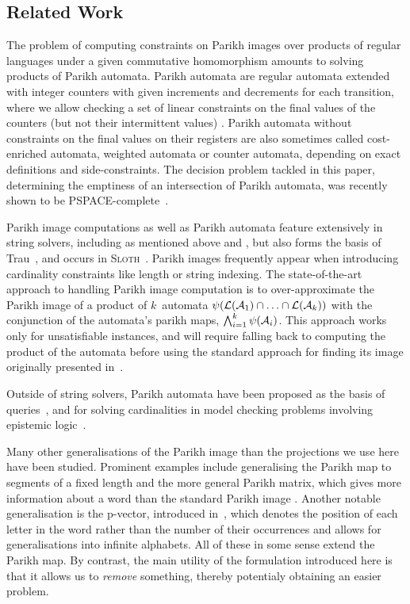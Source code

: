 \documentclass[acmsmall,review,anonymous,screen]{acmart}\settopmatter{printfolios=true,printccs=true,printacmref=true}
\theoremstyle{definition}
\begin{document}
\subsection{Related Work}

The problem of computing constraints on Parikh images over products of regular
languages under a given commutative homomorphism amounts to solving products of
Parikh automata. Parikh automata are regular automata extended with integer
counters with given increments and decrements for each transition, where we
allow checking a set of linear constraints on the final values of the counters
(but not their intermittent values) \cite{parikh-automata}. Parikh automata
without constraints on the final values on their registers are also sometimes
called cost-enriched automata, weighted automata or counter automata, depending
on exact definitions and side-constraints. The decision problem tackled in this
paper, determining the emptiness of an intersection of Parikh automata, was
recently shown to be PSPACE-complete~\cite{graph-queries}.

Parikh image computations as well as Parikh automata feature extensively in
string solvers, including as mentioned above \Ostrich{} and \OstrichPlus{}
\cite{ostrich,ostrich-plus}, but also forms the basis of Trau~\cite{trau-pldi},
and occurs in \textsc{Sloth}~\cite{sloth}. Parikh images frequently appear when
introducing cardinality constraints like length or string indexing. The
state-of-the-art approach to handling Parikh image computation is to
over-approximate the Parikh image of a product of $k$~automata
$\operatorname{\psi}(\operatorname{\mathcal{L}}(\mathcal{A}_1) \cap \ldots \cap \operatorname{\mathcal{L}}(\mathcal{A}_k))$ with the
conjunction of the automata's parikh maps, $\bigwedge_{i=1}^{k}
\operatorname{\psi}(\mathcal{A}_i)$. This approach works only for unsatisfiable instances,
and will require falling back to computing the product of the automata before
using the standard approach for finding its image originally presented
in~\cite{generate-parikh-image}.

Outside of string solvers, Parikh automata have been proposed as the basis of
queries~\cite{graph-queries}, and for solving cardinalities in model checking
problems involving epistemic logic~\cite{epistemic-logic}.

Many other generalisations of the Parikh image than the projections we use here have been
studied. Prominent examples include generalising the Parikh map to segments of a
fixed length \cite{KARHUMAKI1980155} and the more general Parikh matrix, which
gives more information about a word than the standard Parikh image
\cite{parikh-matrix}. Another notable generalisation is the p-vector, introduced
in~\cite{infinite-words}, which denotes the position of each letter in the word
rather than the number of their occurrences and allows for generalisations into
infinite alphabets. All of these in some sense extend the Parikh map. By
contrast, the main utility of the formulation introduced here is that it allows
us to \emph{remove} something, thereby potentialy obtaining an easier problem.
\end{document}
